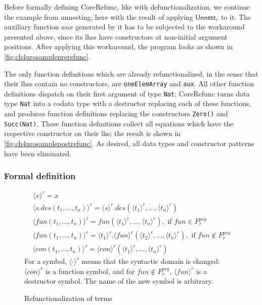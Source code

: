 Before formally defining \textsf{CoreRefunc}, like with defunctionalization, we continue the example from unnesting, here with the result of applying $\textsf{Unnest}_r$ to it. The auxiliary function $aux$ generated by it has to be subjected to the workaround presented above, since its lhss have constructors at non-initial argument positions. After applying this workaround, the program looks as shown in \autoref{fig:ch4urosampleprerefunc}.

The only function definitions which are already refunctionalized, in the sense that their lhss contain no constructors, are \texttt{oneElemArray} and \texttt{aux}. All other function definitions dispatch on their first argument of type \texttt{Nat}; \textsf{CoreRefunc} turns data type \texttt{Nat} into a codata type with a destructor replacing each of these functions, and produces function definitions replacing the constructors \texttt{Zero()} and \texttt{Succ(Nat)}. These function definitions collect all equations which have the respective constructor on their lhs; the result is shown in \autoref{fig:ch4urosamplepostrefunc}. As desired, all data types and constructor patterns have been eliminated.

\subsubsection{Formal definition}

\begin{figure}
\begin{align*}
\langle x \rangle^r = x \\
\langle s.des(t_1, ..., t_n) \rangle^r = \langle s \rangle^r .des(\langle t_1 \rangle^r, ..., \langle t_n \rangle^r) \\
\langle fun(t_1, ..., t_n) \rangle^r = fun(\langle t_1 \rangle^r, ..., \langle t_n \rangle^r), \text{ if } fun \in F^{prg}_r \\
\langle fun(t_1, ..., t_n) \rangle^r = \langle t_1 \rangle^r .\langle fun \rangle^r (\langle t_2 \rangle^r, ..., \langle t_n \rangle^r), \text{ if } fun \not\in F^{prg}_r \\
\langle con(t_1, ..., t_n) \rangle^r = \langle con \rangle^r (\langle t_1 \rangle^r, ..., \langle t_n \rangle^r)
\end{align*}
For a symbol, $\langle \cdot \rangle^r$ means that the syntactic domain is changed: $\langle con \rangle^r$ is a function symbol, and for $fun \not\in F^{prg}_r$, $\langle fun \rangle^r$ is a destructor symbol. The name of the new symbol is arbitrary.
\caption{Refunctionalization of terms}
\label{fig:refuncterm}
\end{figure}

